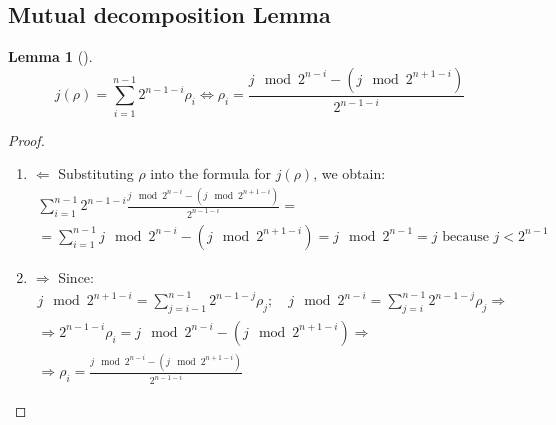 \documentclass[a4paper, openany, 12pt]{article}
\newtheorem{lemma}{Lemma}
\theoremstyle{remark}
\theoremstyle{definition}
\begin{document}
\subsection{Mutual decomposition Lemma \label{sec:j_to_rho}}


\begin{lemma}[]
\begin{equation}
    j(\rho) = \sum_{i=1}^{{n-1}}2^{n-1-i}\rho_{i} \Leftrightarrow \rho_i = \frac{j\mod 2^{n-i} - (j\mod2^{n+1-i}) }{2^{n-1-i}}
\end{equation}
\end{lemma}

\begin{proof}
\begin{enumerate}
    \item $\Leftarrow$ Substituting $\rho$ into the formula for $j(\rho)$, we obtain:
    \begin{multline}
        \sum_{i=1}^{{n-1}}2^{n-1-i} \frac{j\mod 2^{n-i} - (j\mod2^{n+1-i}) }{2^{n-1-i}} = \\ = 
        \sum_{i=1}^{{n-1}}j\mod 2^{n-i} - (j\mod2^{n+1-i}) =j\mod 2^{n-1} = j \text{ because } j<2^{n-1}
    \end{multline}
    
    
    \item $\Rightarrow$  Since:
    \begin{align}
        j\mod2^{n+1-i} = \sum_{j = i-1}^{n-1}2^{n-1-j}\rho_j; \quad
        j\mod2^{n-i} = \sum_{j = i}^{n-1}2^{n-1-j}\rho_j \Rightarrow \\
        \Rightarrow 2^{n-1-i}\rho_i = j\mod 2^{n-i} - (j\mod2^{n+1-i}) \Rightarrow \\ \Rightarrow \rho_i = \frac{j\mod 2^{n-i} - (j\mod2^{n+1-i}) }{2^{n-1-i}}
    \end{align}

\end{enumerate}
\end{proof}
\end{document}
